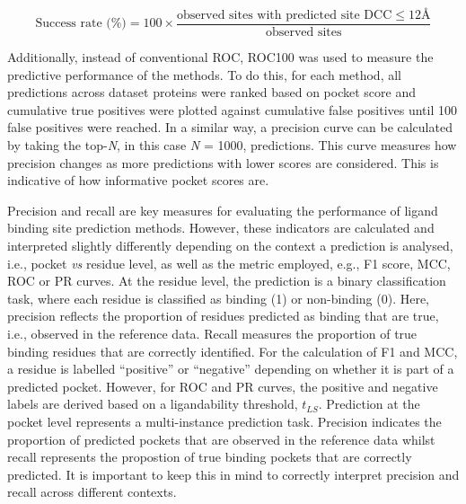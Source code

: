 \begin{equation}
\text{Success rate (\%)} = 100 \times \frac{\text{observed sites with predicted site DCC} \leq 12 \text{Å}}{\text{observed sites}}
\label{eq:success_rate}
\end{equation}

\vspace{-12pt} %

Additionally, instead of conventional ROC, ROC100 \cite{WEBBER_2003_ROC100, SCOTT_2007_ROC100} was used to measure the predictive performance of the methods. To do this, for each method, all predictions across dataset proteins were ranked based on pocket score and cumulative true positives were plotted against cumulative false positives until 100 false positives were reached. In a similar way, a precision curve can be calculated by taking the top-\textit{N}, in this case \textit{N} = 1000, predictions. This curve measures how precision changes as more predictions with lower scores are considered. This is indicative of how informative pocket scores are.

Precision and recall are key measures for evaluating the performance of ligand binding site prediction methods. However, these indicators are calculated and interpreted slightly differently depending on the context a prediction is analysed, i.e., pocket \textit{vs} residue level, as well as the metric employed, e.g., F1 score, MCC, ROC or PR curves. At the residue level, the prediction is a binary classification task, where each residue is classified as binding (1) or non-binding (0). Here, precision reflects the proportion of residues predicted as binding that are true, i.e., observed in the reference data. Recall measures the proportion of true binding residues that are correctly identified. For the calculation of F1 and MCC, a residue is labelled ``positive'' or ``negative'' depending on whether it is part of a predicted pocket. However, for ROC and PR curves, the positive and negative labels are derived based on a ligandability threshold, $t_{LS}$. Prediction at the pocket level represents a multi-instance prediction task. Precision indicates the proportion of predicted pockets that are observed in the reference data whilst recall represents the propostion of true binding pockets that are correctly predicted. It is important to  keep this in mind to correctly interpret precision and recall across different contexts.

